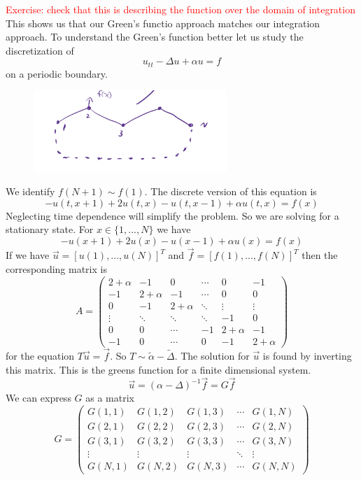 \documentclass[11pt,a4paper]{article}
\begin{document}
\textcolor{red}{Exercise: check that this is describing the function over the domain of integration} This shows us that our Green's functio approach matches our integration approach. To understand the Green's function better let us study the discretization of 
$$
u_{tt}-\Delta u +\alpha u = f
$$
on a periodic boundary.
\begin{figure}[H]
	\centering
	\includegraphics[width=0.65\textwidth]{periodicchain.png} %
\end{figure}
We identify $f(N+1)\sim f(1)$. The discrete version of this equation is
$$
-u(t,x+1)+ 2u(t,x)-u(t,x-1)+\alpha u(t,x) = f(x)
$$
Neglecting time dependence will simplify the problem. So we are solving for a stationary state.
For $x\in\{1,...,N\}$ we have
$$
-u(x+1) + 2u(x)-u(x-1)+\alpha u(x) = f(x)
$$
If we have $\vec{u}=[u(1),...,u(N)]^{T}$ and $\vec{f} = [f(1),...,f(N)]^{T}$ then the corresponding matrix is
\[
A =
\begin{pmatrix}
	2+\alpha & -1        & 0         & \cdots  & 0         & -1 \\
	-1        & 2+\alpha & -1        & \cdots  & 0         & 0  \\
	0         & -1        & 2+\alpha & \ddots  & \vdots    & \vdots \\
	\vdots    & \ddots   & \ddots    & \ddots  & -1        & 0 \\
	0         & 0         & \cdots   & -1      & 2+\alpha  & -1 \\
	-1        & 0         & \cdots   & 0       & -1        & 2+\alpha
\end{pmatrix}
\]
for the equation $T\vec{u} = \vec{f}$. So $T\sim \tilde{\alpha}-\tilde{\Delta}$. The solution for $\vec{u}$ is found by inverting this matrix. This is the greens function for a finite dimensional system.
$$
\vec{u} = (\alpha-\Delta)^{-1}\vec{f}=G\vec{f}
$$
We can express $G$ as a matrix
\[
G =
\begin{pmatrix}
	G(1,1) & G(1,2) & G(1,3) & \cdots & G(1,N) \\
	G(2,1) & G(2,2) & G(2,3) & \cdots & G(2,N) \\
	G(3,1) & G(3,2) & G(3,3) & \cdots & G(3,N) \\
	\vdots & \vdots & \vdots & \ddots & \vdots \\
	G(N,1) & G(N,2) & G(N,3) & \cdots & G(N,N)
\end{pmatrix}
\]
\end{document}

